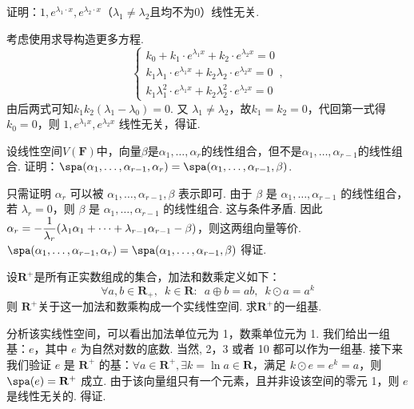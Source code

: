 \begin{exercise}
\begin{exgroup}
        \item 证明：$1,e^{\lambda_1\cdot x},e^{\lambda_2\cdot x}$（$\lambda_1\neq\lambda_2$且均不为0）线性无关.
        \begin{answer}
            考虑使用求导构造更多方程.
            \[\begin{cases}
                    k_0+k_1\cdot e^{\lambda_1 x}+k_2\cdot e^{\lambda_2 x}=0               \\
                    k_1\lambda_1\cdot e^{\lambda_1 x}+k_2\lambda_2\cdot e^{\lambda_2 x}=0 \\
                    k_1\lambda_1^2\cdot e^{\lambda_1 x}+k_2\lambda_2^2\cdot e^{\lambda_2 x}=0
                \end{cases},\]
          由后两式可知$k_1k_2(\lambda_1-\lambda_0)=0$. 又 $\lambda_1\neq\lambda_2$，故$k_1=k_2=0$，代回第一式得 $k_0=0$，则 $1,e^{\lambda_1x},e^{\lambda_2x}$ 线性无关，得证.
        \end{answer}

        \item 设线性空间$V(\mathbf{F})$中，向量$\beta$是$\alpha_1,\ldots,\alpha_r$的线性组合，但不是$\alpha_1,\ldots,\alpha_{r-1}$的线性组合. 证明：$\spa(\alpha_1,\ldots,\alpha_{r-1},\alpha_r)=\spa(\alpha_1,\ldots,\alpha_{r-1},\beta)$.
        \begin{answer}
            只需证明 $\alpha_r$ 可以被 $\alpha_1,\ldots,\alpha_{r-1},\beta$ 表示即可. 由于 $\beta$ 是 $\alpha_1,\ldots,\alpha_{r-1}$ 的线性组合，若 $\lambda_r=0$，则 $\beta$ 是 $\alpha_1,\ldots,\alpha_{r-1}$ 的线性组合. 这与条件矛盾. 因此 $\alpha_r=-\vspace{1ex}\dfrac 1{\lambda_r}(\lambda_1\alpha_1+\cdots+\lambda_{r-1}\alpha_{r-1}-\beta)$，则这两组向量等价. $\spa(\alpha_1,\ldots,\alpha_{r-1},\alpha_r)=\spa(\alpha_1,\ldots,\alpha_{r-1},\beta)$ 得证.
        \end{answer}

        \item \label{item:3:正实数线性空间}
        设$\mathbf{R}^+$是所有正实数组成的集合，加法和数乘定义如下：
        \[ \forall a,b \in \mathbf{R}_+,\enspace k\in \mathbf{R}\colon\enspace a\oplus b = ab,\enspace k\odot a = a^k \]
        则 $\mathbf{R}^+$关于这一加法和数乘构成一个实线性空间. 求$\mathbf{R}^+$的一组基.
        \begin{answer}
            分析该实线性空间，可以看出加法单位元为 1，数乘单位元为 1. 我们给出一组基：$e$，其中 $e$ 为自然对数的底数. 当然, 2，3 或者 10 都可以作为一组基. 接下来我们验证 $e$ 是 $\mathbf{R}^+$ 的基：$\forall a\in \mathbf{R}^+,\exists k=\ln a\in\mathbf{R}$，满足 $k\odot e=e^k=a$，则 $\spa(e)=\mathbf{R}^+$ 成立. 由于该向量组只有一个元素，且并非设该空间的零元 1，则 $e$ 是线性无关的. 得证.
        \end{answer}
    \end{exgroup}


\end{exercise}
